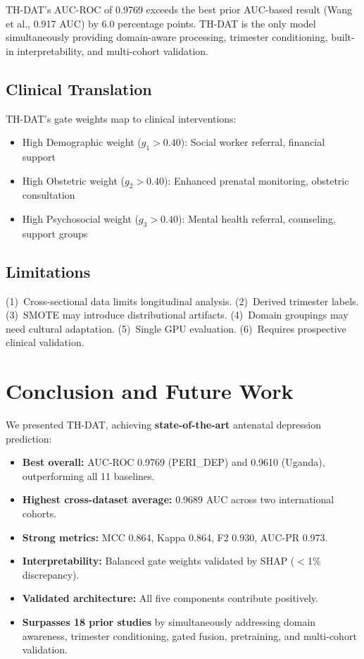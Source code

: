 \documentclass[12pt,a4paper]{article}
\begin{document}
TH-DAT's AUC-ROC of 0.9769 exceeds the best prior AUC-based result (Wang et al., 0.917 AUC) by 6.0 percentage points. TH-DAT is the only model simultaneously providing domain-aware processing, trimester conditioning, built-in interpretability, and multi-cohort validation.

\subsection{Clinical Translation}

TH-DAT's gate weights map to clinical interventions:
\begin{itemize}
    \item High Demographic weight ($g_1 > 0.40$): Social worker referral, financial support
    \item High Obstetric weight ($g_2 > 0.40$): Enhanced prenatal monitoring, obstetric consultation
    \item High Psychosocial weight ($g_3 > 0.40$): Mental health referral, counseling, support groups
\end{itemize}

\subsection{Limitations}

(1)~Cross-sectional data limits longitudinal analysis. (2)~Derived trimester labels. (3)~SMOTE may introduce distributional artifacts. (4)~Domain groupings may need cultural adaptation. (5)~Single GPU evaluation. (6)~Requires prospective clinical validation.

\section{Conclusion and Future Work}

We presented TH-DAT, achieving \textbf{state-of-the-art} antenatal depression prediction:

\begin{itemize}
    \item \textbf{Best overall:} AUC-ROC 0.9769 (PERI\_DEP) and 0.9610 (Uganda), outperforming all 11 baselines.
    \item \textbf{Highest cross-dataset average:} 0.9689 AUC across two international cohorts.
    \item \textbf{Strong metrics:} MCC 0.864, Kappa 0.864, F2 0.930, AUC-PR 0.973.
    \item \textbf{Interpretability:} Balanced gate weights validated by SHAP ($<$1\% discrepancy).
    \item \textbf{Validated architecture:} All five components contribute positively.
    \item \textbf{Surpasses 18 prior studies} by simultaneously addressing domain awareness, trimester conditioning, gated fusion, pretraining, and multi-cohort validation.
\end{itemize}
\end{document}
